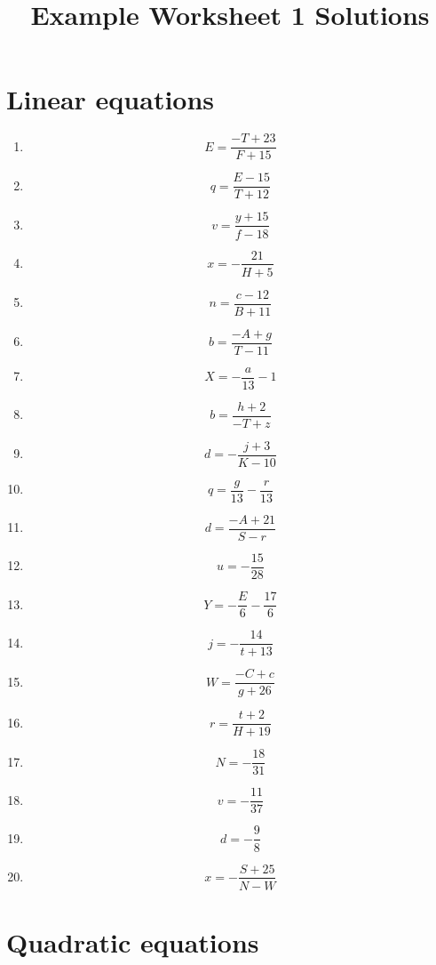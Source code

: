 \documentclass{article}
\begin{document}
    \title{Example Worksheet 1 Solutions} 
 \date{\vspace{-5ex}} 
 \maketitle

        \section{Linear equations}
        
        \begin{enumerate}
        \item$$E =\frac{- T + 23}{F + 15}$$
\item$$q =\frac{E - 15}{T + 12}$$
\item$$v =\frac{y + 15}{f - 18}$$
\item$$x =- \frac{21}{H + 5}$$
\item$$n =\frac{c - 12}{B + 11}$$
\item$$b =\frac{- A + g}{T - 11}$$
\item$$X =- \frac{a}{13} - 1$$
\item$$b =\frac{h + 2}{- T + z}$$
\item$$d =- \frac{j + 3}{K - 10}$$
\item$$q =\frac{g}{13} - \frac{r}{13}$$
\item$$d =\frac{- A + 21}{S - r}$$
\item$$u =- \frac{15}{28}$$
\item$$Y =- \frac{E}{6} - \frac{17}{6}$$
\item$$j =- \frac{14}{t + 13}$$
\item$$W =\frac{- C + c}{g + 26}$$
\item$$r =\frac{t + 2}{H + 19}$$
\item$$N =- \frac{18}{31}$$
\item$$v =- \frac{11}{37}$$
\item$$d =- \frac{9}{8}$$
\item$$x =- \frac{S + 25}{N - W}$$
        \end{enumerate}
        

        \section{Quadratic equations}
        
\end{document}
